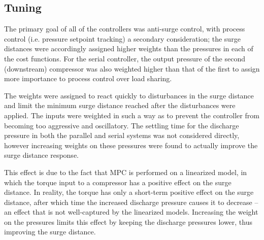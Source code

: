 \subsection{Tuning}


The primary goal of all of the controllers was anti-surge control, with process control (i.e. pressure setpoint tracking) a secondary consideration; the surge distances were accordingly assigned higher weights than the pressures in each of the cost functions.
For the serial controller, the output pressure of the second (downstream) compressor was also weighted higher than that of the first to assign more importance to process control over load sharing.

The weights were assigned to react quickly to disturbances in the surge distance and limit the minimum surge distance reached after the disturbances were applied.
The inputs were weighted in such a way as to prevent the controller from becoming too aggressive and oscillatory.
The settling time for the discharge pressure in both the parallel and serial systems was not considered directly, however increasing weights on these pressures were found to actually improve the surge distance response.

This effect is due to the fact that MPC is performed on a linearized model, in which the torque input to a compressor has a positive effect on the surge distance.
In reality, the torque has only a short-term positive effect on the surge distance, after which time the increased discharge pressure causes it to decrease -- an effect that is not well-captured by the linearized models.
Increasing the weight on the pressures limits this effect by keeping the discharge pressures lower, thus improving the surge distance.

